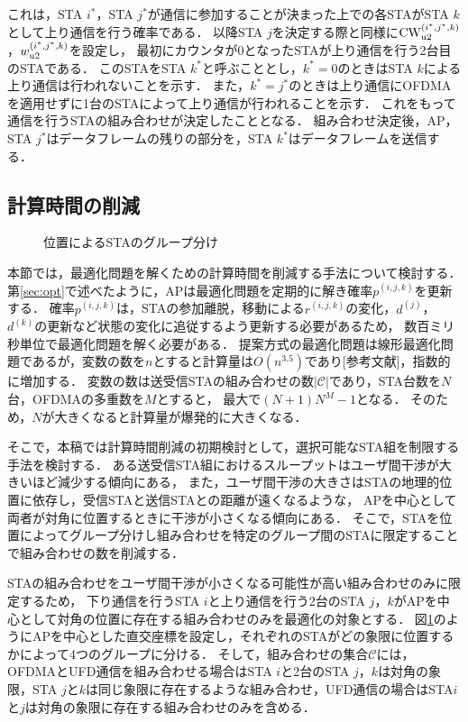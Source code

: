 \documentclass[technicalreport]{ieicej}
\newcommand{\pijk}{p^{(i,j,k)}}
\newcommand{\rijk}{r^{(i,j,k)}}
\newcommand{\mthc}{\mathcal C}
\begin{document}
		これは，STA $i^*$，STA $j^*$が通信に参加することが決まった上での各STAがSTA $k$として上り通信を行う確率である．
		以降STA $j$を決定する際と同様に${\rm CW}^{(i^*,j^*,k)}_{\rm u2}$，$w_{\rm u2}^{(i^*,j^*,k)}$を設定し，
		最初にカウンタが0となったSTAが上り通信を行う2台目のSTAである．
		このSTAをSTA $k^*$と呼ぶこととし，$k^*=0$のときはSTA $k$による上り通信は行われないことを示す．
		また，$k^*=j^*$のときは上り通信にOFDMAを適用せずに1台のSTAによって上り通信が行われることを示す．
		これをもって通信を行うSTAの組み合わせが決定したこととなる．
		組み合わせ決定後，AP，STA $j^*$はデータフレームの残りの部分を，STA $k^*$はデータフレームを送信する．

	\subsection{計算時間の削減}\label{sec:time}
		\begin{figure}[t]
			\centering
			\caption{位置によるSTAのグループ分け}
			\label{fig:time_image}
		\end{figure}
		本節では，最適化問題を解くための計算時間を削減する手法について検討する．
		第\ref{sec:opt}で述べたように，APは最適化問題を定期的に解き確率$\pijk$を更新する．
		確率$\pijk$は，STAの参加離脱，移動による$\rijk$の変化，$d^{(j)}$，$d^{(k)}$の更新など状態の変化に追従するよう更新する必要があるため，
		数百ミリ秒単位で最適化問題を解く必要がある．
		提案方式の最適化問題は線形最適化問題であるが，変数の数を$n$とすると計算量は$O(n^{3.5})$であり[参考文献]，指数的に増加する．
		変数の数は送受信STAの組み合わせの数$|{\mthc}|$であり，STA台数を$N$台，OFDMAの多重数を$M$とすると，
		最大で$(N+1)N^M-1$となる．
		そのため，$N$が大きくなると計算量が爆発的に大きくなる．
		\par
		そこで，本稿では計算時間削減の初期検討として，選択可能なSTA組を制限する手法を検討する．
		ある送受信STA組におけるスループットはユーザ間干渉が大きいほど減少する傾向にある，
		また，ユーザ間干渉の大きさはSTAの地理的位置に依存し，受信STAと送信STAとの距離が遠くなるような，
		APを中心として両者が対角に位置するときに干渉が小さくなる傾向にある．
		そこで，STAを位置によってグループ分けし組み合わせを特定のグループ間のSTAに限定することで組み合わせの数を削減する．
		\par
		STAの組み合わせをユーザ間干渉が小さくなる可能性が高い組み合わせのみに限定するため，
		下り通信を行うSTA $i$と上り通信を行う2台のSTA $j$，$k$がAPを中心として対角の位置に存在する組み合わせのみを最適化の対象とする．
		図\ref{fig:time_image}のようにAPを中心とした直交座標を設定し，それぞれのSTAがどの象限に位置するかによって4つのグループに分ける．
		そして，組み合わせの集合$\mthc$には，OFDMAとUFD通信を組み合わせる場合はSTA $i$と2台のSTA $j$，$k$は対角の象限，STA $j$と$k$は同じ象限に存在するような組み合わせ，UFD通信の場合はSTA$i$と$j$は対角の象限に存在する組み合わせのみを含める．
\end{document}
